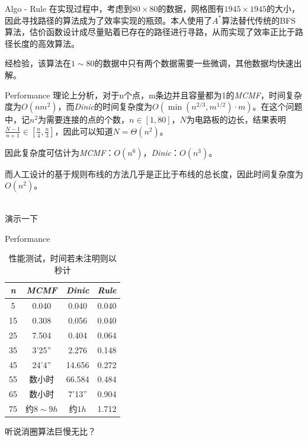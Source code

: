 \documentclass{beamer}
\begin{document}
\begin{frame}{Algo - Rule}
在实现过程中，考虑到$80\times 80$的数据，网格图有$1945\times 1945$的大小，因此寻找路径的算法成为了效率实现的瓶颈。本人使用了$A^*$算法替代传统的BFS算法，估价函数设计成尽量贴着已存在的路径进行寻路，从而实现了效率正比于路径长度的高效算法。

经检验，该算法在$1\sim 80$的数据中只有两个数据需要一些微调，其他数据均快速出解。
\end{frame}

\begin{frame}{Performance}
理论上分析，对于n个点，m条边并且容量都为1的\emph{MCMF}，时间复杂度为$O(nm^2)$，而\emph{Dinic}的时间复杂度为$O(\min{(n^{2/3},m^{1/2})}\cdot m)$。在这个问题中，记$n^2$为需要连接的点的个数，$n\in [1,80]$，$N$为电路板的边长，结果表明$\frac{N - 1}{n + 1}\in [\frac{n}{4}, \frac{n}{3}]$，因此可以知道$N = \Theta(n^2)$。

因此复杂度可估计为\emph{MCMF}：$O(n^6)$，\emph{Dinic}：$O(n^3)$。

而人工设计的基于规则布线的方法几乎是正比于布线的总长度，因此时间复杂度为$O(n^2)$。

~\\

\pause 演示一下
\end{frame}
\begin{frame}{Performance}
\begin{table}[H]
\label{tab:1}
\centering
\begin{tabular}{|c|c|c|c|}
\hline
\emph{n} & \emph{MCMF} & \emph{Dinic} & \emph{Rule}\\
\hline
5 & 0.040& 0.040& 0.040\\
\hline
15 & 0.308&0.056 & 0.040\\
\hline
25 & 7.504& 0.404& 0.064\\
\hline
35 &3'25'' & 2.276& 0.148\\
\hline
45 &24'4'' & 14.656& 0.272\\
\hline
55 &数小时 &66.584 & 0.484\\
\hline
65 &数小时 &7'13'' & 0.904\\
\hline
75 &约$8\sim 9h$&约$1h$  & 1.712\\
\hline
\end{tabular}
\caption{性能测试，时间若未注明则以秒计}
\end{table} 
\pause 听说消圈算法巨慢无比？
\end{frame}
\end{document}
